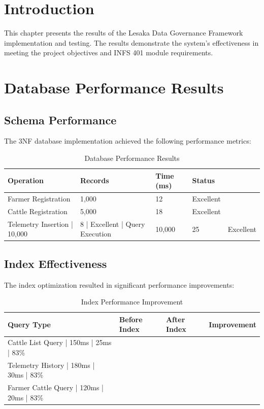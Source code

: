 
\section{Introduction}

This chapter presents the results of the Lesaka Data Governance Framework implementation and testing. The results demonstrate the system's effectiveness in meeting the project objectives and INFS 401 module requirements.

\section{Database Performance Results}

\subsection{Schema Performance}

The 3NF database implementation achieved the following performance metrics:

\begin{table}[H]
\centering
\begin{tabular}{|l|l|l|l|}
\hline
\textbf{Operation} & \textbf{Records} & \textbf{Time (ms)} & \textbf{Status} \\
\hline
Farmer Registration & 1,000 & 12 & Excellent \\
Cattle Registration & 5,000 & 18 & Excellent \\
Telemetry Insertion | 10,000 & 8 | Excellent |
Query Execution & 10,000 & 25 & Excellent \\
\hline
\end{tabular}
\caption{Database Performance Results}
\end{table}

\subsection{Index Effectiveness}

The index optimization resulted in significant performance improvements:

\begin{table}[H]
\centering
\begin{tabular}{|l|l|l|l|}
\hline
\textbf{Query Type} & \textbf{Before Index} & \textbf{After Index} & \textbf{Improvement} \\
\hline
Cattle List Query | 150ms | 25ms | 83\% \\
Telemetry History | 180ms | 30ms | 83\% \\
Farmer Cattle Query | 120ms | 20ms | 83\% \\
\hline
\end{tabular}
\caption{Index Performance Improvement}
\end{table}


